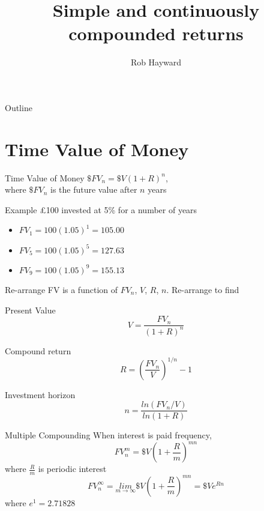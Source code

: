 \documentclass[14pt,xcolor=pdftex,dvipsnames,table]{beamer}
\title{Simple and continuously compounded returns}
\author{Rob Hayward}
\begin{document}
\begin{frame}
\titlepage
\end{frame}

\begin{frame}{Outline}
\tableofcontents
\end{frame}


\section{Time Value of Money}
\begin{frame}{Time Value of Money}
$\$FV_n = \$V(1+R)^n$, \\
\vskip1cm
where $\$FV_n$ is the future value after $n$ years 
\end{frame}

\begin{frame}{Example}
£100 invested at 5\% for a number of years
\pause
\begin{itemize}[<+-| alert@+>]
\item $FV_1 = 100(1.05)^1 = 105.00$
\item $FV_5 = 100(1.05)^5 = 127.63$
\item $FV_9 = 100(1.05)^9 = 155.13$
\end{itemize}
\end{frame}

\begin{frame}{Re-arrange}
FV is a function of $FV_n$, $V$, $R$, $n$.   Re-arrange to find
\pause
\begin{block}{Present Value}
\begin{equation}\label{eqref:pv}
V=\frac{FV_n}{(1+R)^n}
\end{equation}
\end{block}
\pause
\begin{block}{Compound return}
\begin{equation}\label{eqref:cr}
R=\left( \frac{FV_n}{V} \right)^{1/n} - 1
\end{equation}
\end{block}
\pause
\begin{block}{Investment horizon}
\begin{equation}\label{eqref:ih}
n=\frac{ln(FV_n/V)}{ln(1+R)}
\end{equation}
\end{block}
\end{frame} 

\begin{frame}{Multiple Compounding}
When interest is paid frequency, 
\begin{equation}
FV^m_n = \$V \left( 1+\frac{R}{m}\right)^{mn}
\end{equation}
where $\frac{R}{m}$ is periodic interest
\begin{equation}\label{eqref:cc}
FV^{\infty}_n=\underset{m \rightarrow \infty}{lim}\$V \left(1+\frac{R}{m} \right)^{mn} = \$Ve^{Rn}
\end{equation}
where $e^1=2.71828$
\end{frame}
\end{document}

